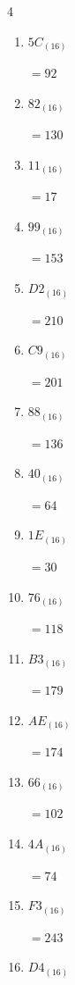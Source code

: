 \begin{multicols}{4}
\begin{enumerate}
        $=8$

  \item $5C_{(16)}$

        $=92$

  \item $82_{(16)}$

        $=130$

  \item $11_{(16)}$

        $=17$

  \item $99_{(16)}$

        $=153$

  \item $D2_{(16)}$

        $=210$

  \item $C9_{(16)}$

        $=201$

  \item $88_{(16)}$

        $=136$

\columnbreak %

\resetques

  \item $40_{(16)}$

        $=64$

  \item $1E_{(16)}$

        $=30$

  \item $76_{(16)}$

        $=118$

  \item $B3_{(16)}$

        $=179$

  \item $AE_{(16)}$

        $=174$

  \item $66_{(16)}$

        $=102$

  \item $4A_{(16)}$

        $=74$

  \item $F3_{(16)}$

        $=243$

  \item $D4_{(16)}$


\end{enumerate}
\end{multicols}
